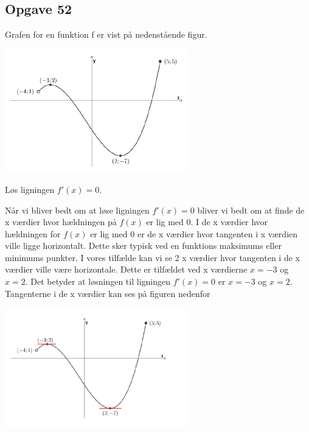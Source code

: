 \subsection{Opgave 52}

Grafen for en funktion f er vist på nedenstående figur.

\includegraphics[width=8cm]{Opgave_51-56/Opgave_52/52.png}

Løs ligningen $f'(x) = 0$.

\ans

Når vi bliver bedt om at løse ligningen $f'(x) = 0$ bliver vi bedt om at finde de x værdier hvor hældningen på 
$f(x)$ er lig med 0. I de x værdier hvor hældningen for $f(x)$ er lig med 0 er de x værdier hvor tangenten i x værdien ville ligge horizontalt.
Dette sker typisk ved en funktions maksimums eller minimums punkter. I vores tilfælde kan vi se 2 x værdier hvor tangenten i de x værdier ville være horizontale.
Dette er tilfældet ved x værdierne $x = -3$ og $x = 2$. Det betyder at løsningen til ligningen $f'(x) = 0$ er 
$x = -3$ og $x = 2$. Tangenterne i de x værdier kan ses på figuren nedenfor  

\includegraphics[width=8cm]{Opgave_51-56/Opgave_52/52.1.png}